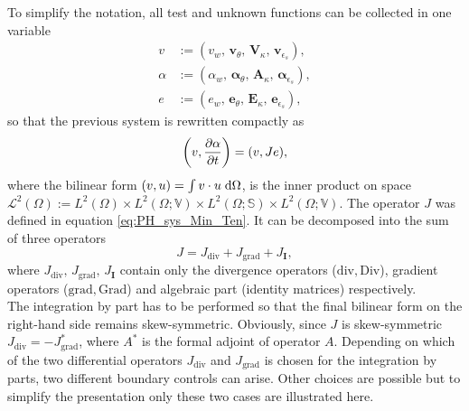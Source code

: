 \documentclass{ifacconf}
\begin{document}
To simplify the notation, all test and unknown functions can be collected in one variable
\begin{equation}
\begin{aligned}
v &:= (v_{w},\, \bm{v}_{\theta},\, \bm{V}_{\kappa},\, \bm{v}_{\epsilon_s}),\\
\alpha &:= (\alpha_{w},\, \bm{\alpha}_{\theta},\, \bm{A}_{\kappa},\, \bm{\alpha}_{\epsilon_s}), \\
e &:= (e_{w},\, \bm{e}_{\theta},\, \bm{E}_{\kappa},\, \bm{e}_{\epsilon_s}),
\end{aligned}
\end{equation}
so that the previous system is rewritten compactly as
\begin{equation}
	\left(v, \diffp{\alpha}{t}\right) = (v, Je),
\end{equation}
where the bilinear form $(v,u) = \int v \cdot u \d{\Omega}$, is the inner product on space $\mathscr{L}^2(\Omega) := 
L^2(\Omega) \times L^2(\Omega; \mathbb{V}) \times L^2(\Omega; \mathbb{S}) \times L^2(\Omega; \mathbb{V})$. The operator $J$ was defined in equation \eqref{eq:PH_sys_Min_Ten}. It can be decomposed into the sum of three operators
\begin{equation}
	J = J_{\text{div}} + J_{\text{grad}} + J_{\bm{I}}, 
\end{equation}
where $J_{\text{div}},\, J_{\text{grad}},\, J_{\bm{I}}$ contain only the divergence operators ($\mathrm{div}, \mathrm{Div}$), gradient operators ($\mathrm{grad}, \mathrm{Grad}$) and algebraic part (identity matrices) respectively. \\
The integration by part has to be performed so that the final bilinear form on the right-hand side remains skew-symmetric. Obviously, since $J$ is skew-symmetric $J_{\text{div}} = - J_{\text{grad}}^*$, where $A^*$ is the formal adjoint of operator $A$. Depending on which of the two differential operators $J_{\text{div}}$ and $J_{\text{grad}}$ is chosen for the integration by parts, two different boundary controls can arise. Other choices are possible but to simplify the presentation only these two cases are illustrated here. 
\end{document}
